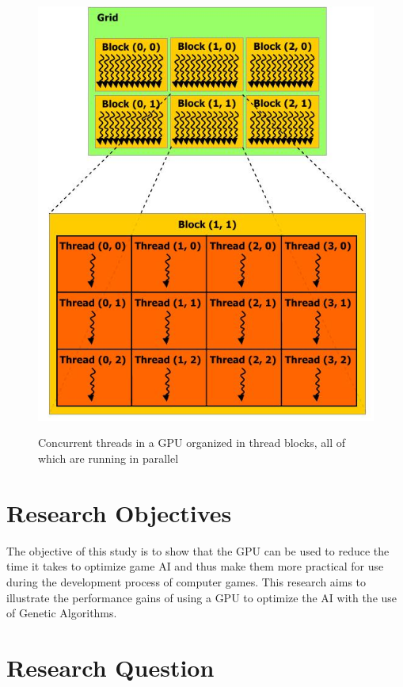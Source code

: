 \begin{figure}
	\centering
		\graphicspath{{images/}}
		\includegraphics[width=450 pt]{gpu.jpg}
	\caption{Concurrent threads in a GPU organized in thread blocks, all of which
are running in parallel}
	\cite{pdf:NVCudaPrgGuide}
	\label{fig:gpu_diagram}
\end{figure}

\section{Research Objectives}

The objective of this study is to show that the GPU can be used to reduce the time
it takes to optimize game AI and thus make them more practical for use during the
development process of computer games. This research aims to illustrate the
performance gains of using a GPU to optimize the AI with the use of Genetic Algorithms.


\section{Research Question}


